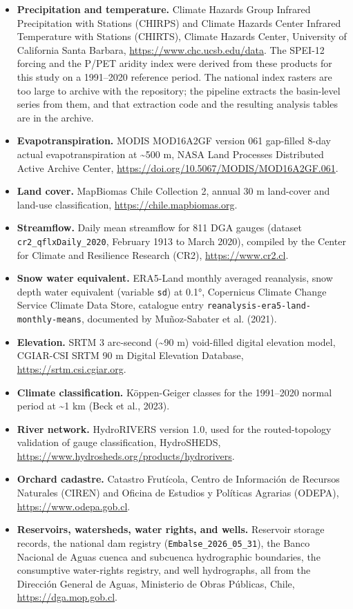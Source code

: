 \documentclass[
]{agujournal2019}
\providecommand{\tightlist}{%
  \setlength{\itemsep}{0pt}\setlength{\parskip}{0pt}}
\begin{document}
\begin{itemize}
\tightlist
\item
  \textbf{Precipitation and temperature.} Climate Hazards Group Infrared
  Precipitation with Stations (CHIRPS) and Climate Hazards Center
  Infrared Temperature with Stations (CHIRTS), Climate Hazards Center,
  University of California Santa Barbara,
  \url{https://www.chc.ucsb.edu/data}. The SPEI-12 forcing and the P/PET
  aridity index were derived from these products for this study on a
  1991--2020 reference period. The national index rasters are too large
  to archive with the repository; the pipeline extracts the basin-level
  series from them, and that extraction code and the resulting analysis
  tables are in the archive.
\item
  \textbf{Evapotranspiration.} MODIS MOD16A2GF version 061 gap-filled
  8-day actual evapotranspiration at \textasciitilde500 m, NASA Land
  Processes Distributed Active Archive Center,
  \url{https://doi.org/10.5067/MODIS/MOD16A2GF.061}.
\item
  \textbf{Land cover.} MapBiomas Chile Collection 2, annual 30 m
  land-cover and land-use classification,
  \url{https://chile.mapbiomas.org}.
\item
  \textbf{Streamflow.} Daily mean streamflow for 811 DGA gauges (dataset
  \texttt{cr2\_qflxDaily\_2020}, February 1913 to March 2020), compiled
  by the Center for Climate and Resilience Research (CR2),
  \url{https://www.cr2.cl}.
\item
  \textbf{Snow water equivalent.} ERA5-Land monthly averaged reanalysis,
  snow depth water equivalent (variable \texttt{sd}) at 0.1°, Copernicus
  Climate Change Service Climate Data Store, catalogue entry
  \texttt{reanalysis-era5-land-monthly-means}, documented by
  Muñoz-Sabater et al. (2021).
\item
  \textbf{Elevation.} SRTM 3 arc-second (\textasciitilde90 m)
  void-filled digital elevation model, CGIAR-CSI SRTM 90 m Digital
  Elevation Database, \url{https://srtm.csi.cgiar.org}.
\item
  \textbf{Climate classification.} Köppen-Geiger classes for the
  1991--2020 normal period at \textasciitilde1 km (Beck et al., 2023).
\item
  \textbf{River network.} HydroRIVERS version 1.0, used for the
  routed-topology validation of gauge classification, HydroSHEDS,
  \url{https://www.hydrosheds.org/products/hydrorivers}.
\item
  \textbf{Orchard cadastre.} Catastro Frutícola, Centro de Información
  de Recursos Naturales (CIREN) and Oficina de Estudios y Políticas
  Agrarias (ODEPA), \url{https://www.odepa.gob.cl}.
\item
  \textbf{Reservoirs, watersheds, water rights, and wells.} Reservoir
  storage records, the national dam registry
  (\texttt{Embalse\_2026\_05\_31}), the Banco Nacional de Aguas cuenca
  and subcuenca hydrographic boundaries, the consumptive water-rights
  registry, and well hydrographs, all from the Dirección General de
  Aguas, Ministerio de Obras Públicas, Chile,
  \url{https://dga.mop.gob.cl}.
\end{itemize}
\end{document}
